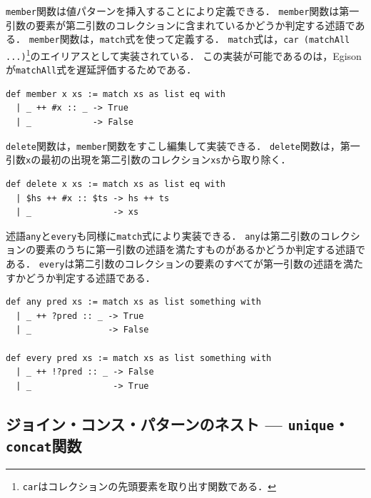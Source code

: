 \lstinline{member}関数は値パターンを挿入することにより定義できる．
\lstinline{member}関数は第一引数の要素が第二引数のコレクションに含まれているかどうか判定する述語である．
\lstinline{member}関数は，\lstinline{match}式を使って定義する．
\lstinline{match}式は，\lstinline{car (matchAll ...)}\footnote{\lstinline{car}はコレクションの先頭要素を取り出す関数である．}のエイリアスとして実装されている．
この実装が可能であるのは，Egisonが\lstinline{matchAll}式を遅延評価するためである．

{\footnotesize
\begin{lstlisting}[language=egison,numbers=none]
def member x xs := match xs as list eq with
  | _ ++ #x :: _ -> True
  | _            -> False
\end{lstlisting}
}

\lstinline{delete}関数は，\lstinline{member}関数をすこし編集して実装できる．
\lstinline{delete}関数は，第一引数\lstinline{x}の最初の出現を第二引数のコレクション\lstinline{xs}から取り除く．

{\footnotesize
\begin{lstlisting}[language=egison,numbers=none]
def delete x xs := match xs as list eq with
  | $hs ++ #x :: $ts -> hs ++ ts
  | _                -> xs
\end{lstlisting}
}

述語\lstinline{any}と\lstinline{every}も同様に\lstinline{match}式により実装できる．
\lstinline{any}は第二引数のコレクションの要素のうちに第一引数の述語を満たすものがあるかどうか判定する述語である．
\lstinline{every}は第二引数のコレクションの要素のすべてが第一引数の述語を満たすかどうか判定する述語である．

\begin{lstlisting}[language=egison,numbers=none]
def any pred xs := match xs as list something with
  | _ ++ ?pred :: _ -> True
  | _               -> False

def every pred xs := match xs as list something with
  | _ ++ !?pred :: _ -> False
  | _                -> True
\end{lstlisting}

\subsection{ジョイン・コンス・パターンのネスト --- \texttt{unique}・\texttt{concat}関数}\label{pmo-nested-join-cons}

